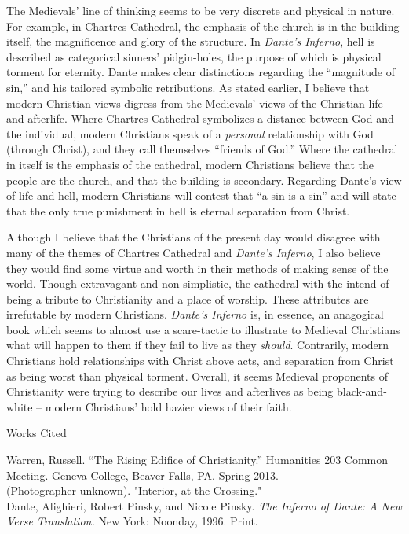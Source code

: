 \documentclass[12pt]{article}
\newcommand{\bibent}{\noindent \hangindent 40pt}
\newenvironment{workscited}{\newpage \begin{center} Works Cited \end{center}}{\newpage }
\begin{document}
\begin{flushleft}
The Medievals' line of thinking seems to be very discrete and physical in
nature. For example, in Chartres Cathedral, the emphasis of the church is in
the building itself, the magnificence and glory of the structure. In 
\emph{Dante's Inferno}, hell is described as categorical sinners' pidgin-holes,
the purpose of which is physical torment for eternity. Dante makes clear
distinctions regarding the ``magnitude of sin,'' and his tailored symbolic
retributions. As stated earlier, I believe that modern Christian views digress
from the Medievals' views of the Christian life and afterlife. Where Chartres
Cathedral symbolizes a distance between God and the individual, modern
Christians speak of a \emph{personal} relationship with God (through Christ),
and they call themselves ``friends of God.'' Where the cathedral in itself
is the emphasis of the cathedral, modern Christians believe that the people
are the church, and that the building is secondary. Regarding Dante's view
of life and hell, modern Christians will contest that ``a sin is a sin'' and
will state that the only true punishment in hell is eternal separation from 
Christ.

Although I believe that the Christians of the present day would disagree with
many of the themes of Chartres Cathedral and \emph{Dante's Inferno}, I also
believe they would find some virtue and worth in their methods of making
sense of the world. Though extravagant and non-simplistic, the cathedral
with the intend of being a tribute to Christianity and a place of worship.
These attributes are irrefutable by modern Christians. \emph{Dante's Inferno}
is, in essence, an anagogical book which seems to almost use a scare-tactic
to illustrate to Medieval Christians what will happen to them if they fail
to live as they \emph{should}. Contrarily, modern Christians hold relationships
with Christ above acts, and separation from Christ as being worst than physical
torment. Overall, it seems Medieval proponents of Christianity were trying to
describe our lives and afterlives as being black-and-white -- modern Christians'
hold hazier views of their faith.



\begin{workscited}

\bibent
Warren, Russell. ``The Rising Edifice of Christianity.'' Humanities 203 Common Meeting. Geneva College, Beaver Falls, PA. Spring 2013. \\

\bibent
(Photographer unknown). "Interior, at the Crossing." \\

\bibent
Dante, Alighieri, Robert Pinsky, and Nicole Pinsky. \emph{The Inferno of Dante: A New Verse Translation.} New York: Noonday, 1996. Print. \\

\end{workscited}

\end{flushleft}
\end{document}
